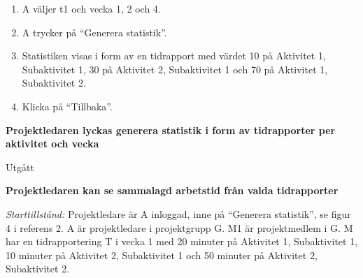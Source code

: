 \documentclass[a4paper]{article}
\begin{document}
\begin{FT}
\begin{enumerate}
\item A väljer t1 och vecka 1, 2 och 4.
\item A trycker på ``Generera statistik''.
\item Statistiken visas i form av en tidrapport med värdet 10 på Aktivitet 1, Subaktivitet 1, 30 på Aktivitet 2, Subaktivitet 1 och 70 på Aktivitet 1, Subaktivitet 2.
\item Klicka på ``Tillbaka''.
\end{enumerate}


\item
\textbf{Projektledaren lyckas generera statistik i form av tidrapporter per aktivitet och vecka}

Utgått





\item
\textbf{Projektledaren kan se sammalagd arbetstid från valda tidrapporter}

\emph{Starttillstånd:} Projektledare är A inloggad, inne på ``Generera statistik'', se figur 4 i referens 2. A är projektledare i projektgrupp G. M1 är projektmedlem i G. M har en tidrapportering T i vecka 1 med 20 minuter på Aktivitet 1, Subaktivitet 1, 10 minuter på Aktivitet 2, Subaktivitet 1 och 50 minuter på Aktivitet 2, Subaktivitet 2.


\end{FT}
\end{document}
